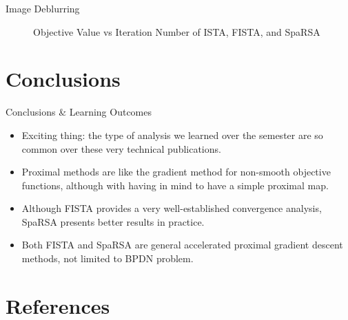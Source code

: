 \documentclass{beamer}
\begin{document}
\begin{frame}{Image Deblurring}
    \begin{figure}
        \centering
        \caption{Objective Value vs Iteration Number of ISTA, FISTA, and SpaRSA}
        \label{fig:plot-combined}
    \end{figure}
\end{frame}

\section{Conclusions}
\begin{frame}{Conclusions \& Learning Outcomes}
    \begin{itemize}
        \item Exciting thing: the type of analysis we learned over the semester are so common over these very technical publications.
        \pause
        \item Proximal methods are like the gradient method for non-smooth objective functions, although with having in mind to have a simple proximal map.
        \pause
        \item Although FISTA provides a very well-established convergence analysis, SpaRSA presents better results in practice.
        \pause
        \item Both FISTA and SpaRSA are general accelerated proximal gradient descent methods, not limited to BPDN problem.
    \end{itemize}
\end{frame}


\section{References}

\begin{frame}[allowframebreaks]
    
    
    \nocite{*} %
    \tiny
\end{frame}
\end{document}
